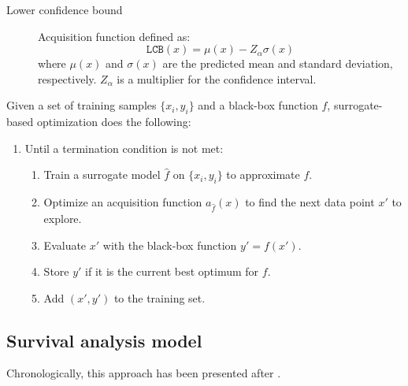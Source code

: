 \begin{description}
\begin{description}
\begin{description}
                        \begin{description}
                            \item[Lower confidence bound]
                                Acquisition function defined as:
                                \[ \texttt{LCB}(x) = \mu(x) - Z_\alpha \sigma(x) \]
                                where $\mu(x)$ and $\sigma(x)$ are the predicted mean and standard deviation, respectively. $Z_\alpha$ is a multiplier for the confidence interval.
                        \end{description}
                \end{description}

                Given a set of training samples $\{ x_i, y_i \}$ and a black-box function $f$, surrogate-based optimization does the following:
                \begin{enumerate}
                    \item Until a termination condition is not met:
                    \begin{enumerate}
                        \item Train a surrogate model $\hat{f}$ on $\{ x_i, y_i \}$ to approximate $f$.
                        \item Optimize an acquisition function $a_{\hat{f}}(x)$ to find the next data point $x'$ to explore.
                        \item Evaluate $x'$ with the black-box function $y' = f(x')$.
                        \item Store $y'$ if it is the current best optimum for $f$.
                        \item Add $(x', y')$ to the training set.
                    \end{enumerate}
                \end{enumerate}
        \end{description}
\end{description}


\subsection{Survival analysis model}

\begin{remark}
    Chronologically, this approach has been presented after .
\end{remark}

